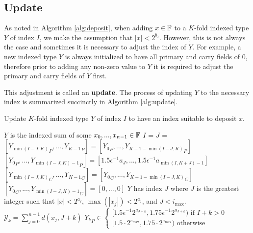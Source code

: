 \subsection{Update}
    \label{sec:primitiveops_update}
    As noted in Algorithm \ref{alg:deposit}, when adding $x \in \mathbb{F}$ to a $K$-fold
    indexed type $Y$ of index $I$, we make the assumption that $|x| < 2^{b_I}$.
    However, this is not always the case and sometimes it is necessary to adjust the index of $Y$.
    For example, a new indexed type $Y$ is always initialized to have all primary
    and carry fields of 0, therefore prior to adding any non-zero value to $Y$
    it is required to adjust the primary and carry fields of $Y$ first.

    This adjustment is called an \textbf{update}.
    The process of updating $Y$ to the necessary index is summarized succinctly
    in Algorithm \ref{alg:update}.

    \begin{samepage}
    \begin{alg}
      Update $K$-fold indexed type $Y$ of index $I$ to have an index suitable to deposit $x$.
      \begin{algorithmic}[1]
        \Require
          \Statex $Y$ is the indexed sum of some $x_0, ..., x_{n - 1} \in \mathbb{F}$
          \State $I$ = 
          \State $J$ = 
            \State $[{Y_{\min(I - J, K)}}_P, ..., {Y_{K - 1}}_P] = [{Y_0}_P, ..., {Y_{K - 1 - \min(I - J, K)}}_P]$
            \State $[{Y_0}_P, ..., {Y_{\min(I - J, K) - 1}}_P] = [1.5  \epsilon^{-1}  a_{J}, ..., 1.5  \epsilon^{-1}  a_{\min(I, K + J) - 1}]$
            \State $[{Y_{\min(I - J, K)}}_C, ..., {Y_{K - 1}}_C] = [{Y_0}_C, ..., {Y_{K - 1 - \min(I - J, K)}}_C]$
            \State $[{Y_0}_C, ..., {Y_{\min(I - J, K) - 1}}_C] = [0, ..., 0]$
          \EndIf
        \EndFunction
        \Ensure
          \Statex $Y$ has index $J$ where $J$ is the greatest integer such that $|x| < 2^{a_j}$, $\max(|x_j|) < 2^{a_j}$, and $J < i_{\max}$.
          \Statex $\mathcal{Y}_k = \sum\limits_{j = 0}^{n - 1} d(x_j, J + k)$
          \Statex ${Y_k}_P \in \begin{cases}[1.5  \epsilon^{-1} 2^{a_{J + k}}, 1.75  \epsilon^{-1} 2^{a_{J + k}}) \text{ if } I + k > 0 \\ [1.5 \cdot 2^{e_{\max}}, 1.75 \cdot 2^{e_{\max}})\text{ otherwise}\end{cases}$
      \end{algorithmic}
      \label{alg:update}
    \end{alg}
    \end{samepage}

